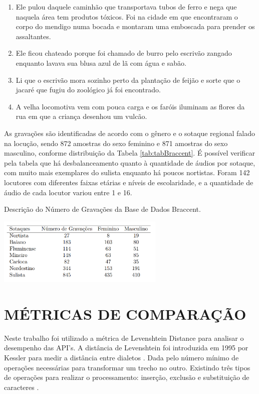 \begin{enumerate}[itemsep=3pt,parsep=3pt]
    \item Ele pulou daquele caminhão que transportava tubos de ferro e nega que naquela área tem produtos tóxicos. Foi na cidade em que encontraram o corpo do mendigo numa bocada e montaram uma emboscada para prender os assaltantes. 
    \item Ele ficou chateado porque foi chamado de burro pelo escrivão zangado enquanto lavava sua blusa azul de lã com água e sabão.
    \item Li que o escrivão mora sozinho perto da plantação de feijão e sorte que o jacaré que fugiu do zoológico já foi encontrado.
    \item A velha locomotiva vem com pouca carga e os faróis iluminam as flores da rua em que a criança desenhou um vulcão.
\end{enumerate}


As gravações são identificadas de acordo com o gênero e o sotaque regional falado na locução, sendo 872 amostras do sexo feminino e 871 amostras do sexo masculino, conforme distribuição da Tabela \ref{tab:tabBraccent}. É possível verificar pela tabela que há desbalanceamento quanto à quantidade de áudios por sotaque, com muito mais exemplares do sulista enquanto há poucos nortistas.  Foram 142 locutores com diferentes faixas etárias e níveis de escolaridade, e a quantidade de áudio de cada locutor variou entre 1 e 16. 

\begin{table}[h!]
\centering
\caption{Descrição do Número de Gravações da Base de Dados Braccent.}
\label{tab:tabBraccent}
\includegraphics[width=0.6\textwidth]{images/tabBraccent.png}
\end{table}



\section{MÉTRICAS DE COMPARAÇÃO}

Neste trabalho foi utilizado a métrica de Levenshtein Distance para analisar o desempenho das API's. A distância de Levenshtein foi introduzida em 1995 por Kessler para medir a distância entre dialetos \cite{kessler1995computational}. Dada pelo número mínimo de operações necessárias para transformar um trecho no outro. Existindo três tipos de operações para realizar o processamento: inserção, exclusão e substituição de caracteres \cite{beijering2008predicting}.

